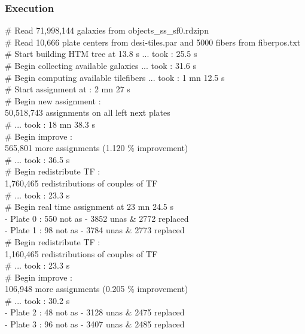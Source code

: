 \documentclass{beamer}
\begin{document}
\begin{frame}\frametitle{Execution}
\begin{tiny}
\# Read 71,998,144 galaxies from objects\_ss\_sf0.rdzipn \\
\# Read 10,666 plate centers from desi-tiles.par and 5000 fibers from fiberpos.txt \\
\# Start building HTM tree at 13.8 s ... took : 25.5 s \\
\# Begin collecting available galaxies ... took : 31.6 s \\
\# Begin computing available tilefibers ... took : 1 mn 12.5 s \\
\# Start assignment at :  2 mn 27 s \\
\# Begin new assignment : \\
  50,518,743 assignments on all left next plates \\
\# ... took : 18 mn 38.3 s \\
\# Begin improve : \\
  565,801 more assignments (1.120 \% improvement) \\
\# ... took : 36.5 s \\
\# Begin redistribute TF : \\
  1,760,465 redistributions of couples of TF \\
\# ... took : 23.3 s \\
\# Begin real time assignment at 23 mn 24.5 s \\
 - Plate 0 :   550 not as -  3852 unas \& 2772 replaced \\
 - Plate 1 :    98 not as -  3784 unas \& 2773 replaced \\
\# Begin redistribute TF : \\
  1,160,465 redistributions of couples of TF \\
\# ... took : 23.3 s \\
\# Begin improve : \\
  106,948 more assignments (0.205 \% improvement) \\
\# ... took : 30.2 s \\
- Plate 2 :   48 not as -  3128 unas \& 2475 replaced \\
- Plate 3 :    96 not as -  3407 unas \& 2485 replaced \\
\end{tiny}
\end{frame}
\end{document}
